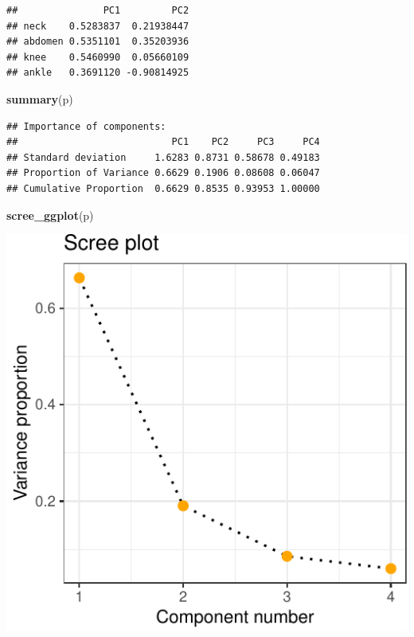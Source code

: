 \documentclass[]{article}
\newenvironment{Shaded}{\begin{snugshade}}{\end{snugshade}}
\newcommand{\KeywordTok}[1]{\textcolor[rgb]{0.13,0.29,0.53}{\textbf{#1}}}
\newcommand{\NormalTok}[1]{#1}
\begin{document}
\begin{verbatim}
##               PC1         PC2
## neck    0.5283837  0.21938447
## abdomen 0.5351101  0.35203936
## knee    0.5460990  0.05660109
## ankle   0.3691120 -0.90814925
\end{verbatim}

\begin{Shaded}
\begin{Highlighting}[]
\KeywordTok{summary}\NormalTok{(p)}
\end{Highlighting}
\end{Shaded}

\begin{verbatim}
## Importance of components:
##                           PC1    PC2     PC3     PC4
## Standard deviation     1.6283 0.8731 0.58678 0.49183
## Proportion of Variance 0.6629 0.1906 0.08608 0.06047
## Cumulative Proportion  0.6629 0.8535 0.93953 1.00000
\end{verbatim}

\begin{Shaded}
\begin{Highlighting}[]
\KeywordTok{scree_ggplot}\NormalTok{(p)}
\end{Highlighting}
\end{Shaded}

\begin{center}\includegraphics{sol_A2_files/figure-latex/unnamed-chunk-10-1} \end{center}
\end{document}
